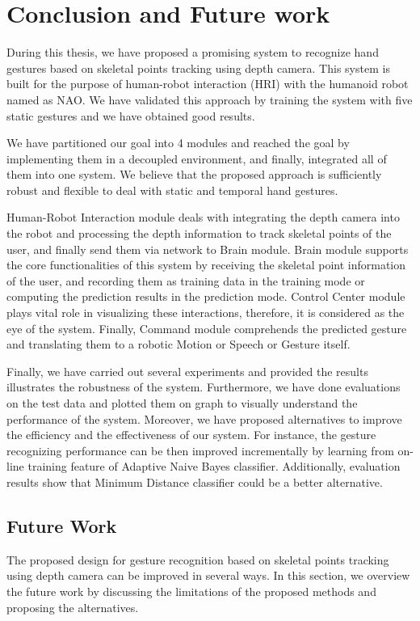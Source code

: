 \chapter{Conclusion and Future work}
During this thesis, we have proposed a promising system to recognize hand gestures based on skeletal points tracking using depth camera. This system is built for the purpose of human-robot interaction (HRI) with the humanoid robot named as NAO. We have validated this approach by training the system with five static gestures and we have obtained good results. 

We have partitioned our goal into 4 modules and reached the goal by implementing them in a decoupled environment, and finally, integrated all of them into one system. We believe that the proposed approach is sufficiently robust and flexible to deal with static and temporal hand gestures. 

Human-Robot Interaction module deals with integrating the depth camera into the robot and processing the depth information to track skeletal points of the user, and finally send them via network to Brain module. Brain module supports the core functionalities of this system by receiving the skeletal point information of the user, and recording them as training data in the training mode or computing the prediction results in the prediction mode. Control Center module plays vital role in visualizing these interactions, therefore, it is considered as the eye of the system. Finally, Command module comprehends the predicted gesture and translating them to a robotic Motion or Speech or Gesture itself.

Finally, we have carried out several experiments and provided the results illustrates the robustness of the system. Furthermore, we have done evaluations on the test data and plotted them on graph to visually understand the performance of the system. Moreover, we have proposed alternatives to improve the efficiency and the effectiveness of our system. For instance, the gesture recognizing performance can be then improved incrementally by learning from on-line training feature of Adaptive Naive Bayes classifier. Additionally, evaluation results show that Minimum Distance classifier could be a better alternative.
 
\section{Future Work}
The proposed design for gesture recognition based on skeletal points tracking using depth camera can be improved in several ways. In this section, we overview the future work by discussing the limitations of the proposed methods and proposing the alternatives.

